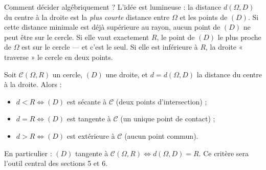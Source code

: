 \documentclass[11pt]{article}
\begin{document}
Comment décider algébriquement ? L'idée est lumineuse : la distance $d(\Omega, D)$ du centre à la droite est la \emph{plus courte} distance entre $\Omega$ et les points de $(D)$. Si cette distance minimale est déjà supérieure au rayon, aucun point de $(D)$ ne peut être sur le cercle. Si elle vaut exactement $R$, le point de $(D)$ le plus proche de $\Omega$ est sur le cercle — et c'est le seul. Si elle est inférieure à $R$, la droite « traverse » le cercle en deux points.

\begin{propriete}
Soit $\mathcal{C}(\Omega, R)$ un cercle, $(D)$ une droite, et $d = d(\Omega, D)$ la distance du centre à la droite. Alors :
\begin{itemize}
\item $d < R \iff (D)$ est sécante à $\mathcal{C}$ (deux points d'intersection) ;
\item $d = R \iff (D)$ est tangente à $\mathcal{C}$ (un unique point de contact) ;
\item $d > R \iff (D)$ est extérieure à $\mathcal{C}$ (aucun point commun).
\end{itemize}
En particulier : $(D)$ tangente à $\mathcal{C}(\Omega, R) \iff d(\Omega, D) = R$. Ce critère sera l'outil central des sections 5 et 6.
\end{propriete}
\end{document}
